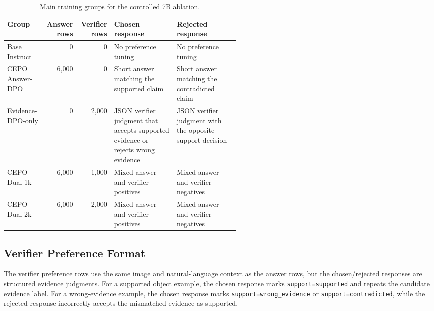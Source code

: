 \documentclass[10pt,twocolumn,letterpaper]{article}
\newcommand{\answerdpo}{CEPO Answer-DPO}
\newcommand{\evidencedpo}{Evidence-DPO-only}
\newcommand{\dualonek}{CEPO-Dual-1k}
\newcommand{\dualtwok}{CEPO-Dual-2k}
\begin{document}
\begin{table}[t]
\centering
\footnotesize
\setlength{\tabcolsep}{4pt}
\begin{tabular}{@{}lrrp{0.27\linewidth}p{0.27\linewidth}@{}}
\toprule
Group & Answer rows & Verifier rows & Chosen response & Rejected response \\
\midrule
Base Instruct & 0 & 0 & No preference tuning & No preference tuning \\
\answerdpo{} & 6{,}000 & 0 & Short answer matching the supported claim & Short answer matching the contradicted claim \\
\evidencedpo{} & 0 & 2{,}000 & JSON verifier judgment that accepts supported evidence or rejects wrong evidence & JSON verifier judgment with the opposite support decision \\
\dualonek{} & 6{,}000 & 1{,}000 & Mixed answer and verifier positives & Mixed answer and verifier negatives \\
\dualtwok{} & 6{,}000 & 2{,}000 & Mixed answer and verifier positives & Mixed answer and verifier negatives \\
\bottomrule
\end{tabular}
\caption{Main training groups for the controlled 7B ablation.}
\label{tab:groups}
\end{table}

\subsection{Verifier Preference Format}

The verifier preference rows use the same image and natural-language context
as the answer rows, but the chosen/rejected responses are structured evidence
judgments. For a supported object example, the chosen response marks
\texttt{support=supported} and repeats the candidate evidence label. For a
wrong-evidence example, the chosen response marks
\texttt{support=wrong\_evidence} or \texttt{support=contradicted}, while the
rejected response incorrectly accepts the mismatched evidence as supported.
\end{document}
